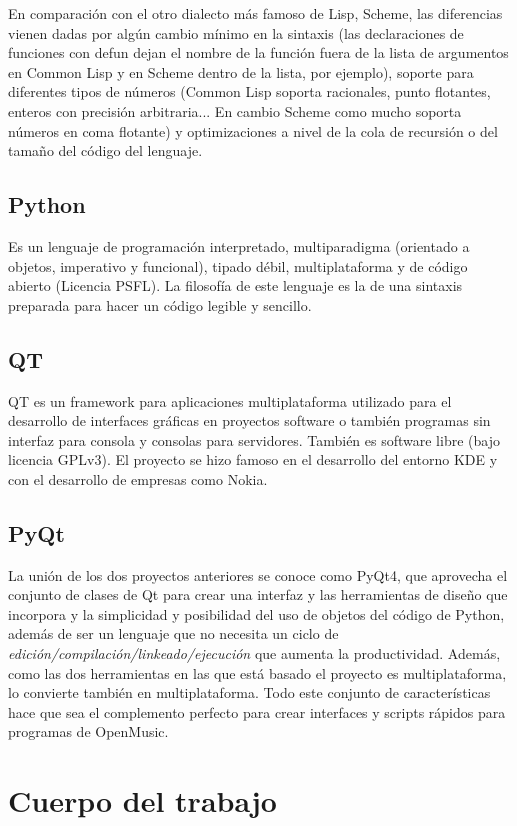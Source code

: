 \documentclass[a4paper,openany,oneside,12pt]{book}
\begin{document}
En comparación con el otro dialecto más famoso de Lisp, Scheme, las diferencias vienen dadas por algún cambio mínimo en la sintaxis (las declaraciones de funciones con defun dejan el nombre de la función fuera de la lista de argumentos en Common Lisp y en Scheme dentro de la lista, por ejemplo), soporte para diferentes tipos de números (Common Lisp soporta racionales, punto flotantes, enteros con precisión arbitraria... En cambio Scheme como mucho soporta números en coma flotante) y optimizaciones a nivel de la cola de recursión o del tamaño del código del lenguaje.

\section{Python}
Es un lenguaje de programación interpretado, multiparadigma (orientado a objetos, imperativo y funcional), tipado débil, multiplataforma y de código abierto (Licencia PSFL). La filosofía de este lenguaje es la de una sintaxis preparada para hacer un código legible y sencillo.

\section{QT}
QT es un framework para aplicaciones multiplataforma utilizado para el desarrollo de interfaces gráficas en proyectos software o también programas sin interfaz para consola y consolas para servidores. También es software libre (bajo licencia GPLv3). El proyecto se hizo famoso en el desarrollo del entorno KDE y con el desarrollo de empresas como Nokia.

\section{PyQt}
La unión de los dos proyectos anteriores se conoce como PyQt4, que aprovecha el conjunto de clases de Qt para crear una interfaz y las herramientas de diseño que incorpora y la simplicidad y posibilidad del uso de objetos del código de Python, además de ser un lenguaje que no necesita un ciclo de \emph{edición/compilación/linkeado/ejecución} que aumenta la productividad. Además, como las dos herramientas en las que está basado el proyecto es multiplataforma, lo convierte también en multiplataforma. Todo este conjunto de características hace que sea el complemento perfecto para crear interfaces y scripts rápidos para programas de OpenMusic.


\chapter{Cuerpo del trabajo}\label{cuerpo}
\end{document}
